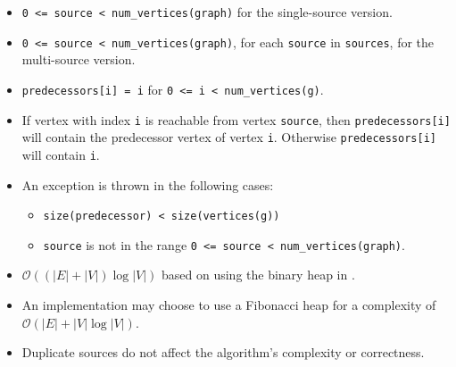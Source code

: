 \begin{itemdescr}
      \pnum\preconditions
            \begin{itemize}
                  \item
                        \lstinline{0 <= source < num_vertices(graph)} for the single-source version.
                  \item
                        \lstinline{0 <= source < num_vertices(graph)}, for each \lstinline{source} in \lstinline{sources}, 
                                   for the multi-source version.
                  \item
                        \lstinline{predecessors[i] = i} for \lstinline{0 <= i < num_vertices(g)}.
            \end{itemize}
      \pnum\effects
            \begin{itemize}
                  \item
                        If vertex with index \lstinline{i} is reachable
                        from vertex \lstinline{source}, then \lstinline{predecessors[i]} will contain the
                        predecessor vertex of vertex \lstinline{i}. Otherwise \lstinline{predecessors[i]} will contain
                        \lstinline{i}.
            \end{itemize}
      \pnum\throws 
            \begin{itemize}
                  \item An  exception is thrown in the following cases:
                        \begin{itemize}
                              \item \lstinline{size(predecessor) < size(vertices(g))}
                              \item \lstinline{source} is not in the range \lstinline{0 <= source < num_vertices(graph)}.
                        \end{itemize}
            \end{itemize}
      \pnum\complexity
            \begin{itemize}
                  \item $\mathcal{O}((|E| + |V|)\log{|V|})$ based on using the binary heap in .
                  \item An implementation may choose to use a Fibonacci heap for a complexity of $\mathcal{O}(|E| + |V|\log{|V|})$.
            \end{itemize}
      \pnum\remarks 
            \begin{itemize}
                  \item Duplicate sources do not affect the algorithm's complexity or correctness.
            \end{itemize}
\end{itemdescr}



